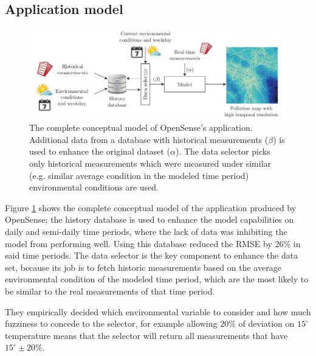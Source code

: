 \documentclass[11pt,a4paper,titlepage]{book}
\begin{document}
\subsection{Application model}
\begin{figure}[ht]
    \centering
    \includegraphics[width=\textwidth]{imgs/ch_2/OpenSense_data_flow.png}
    \caption{The complete conceptual model of OpenSense's application. Additional data from a database with historical measurements ($\beta$) is used to enhance the original dataset ($\alpha$). The data selector picks only historical measurements which were measured under similar (e.g. similar average condition in the modeled time period) environmental conditions are used. } 
    \label{opensense_flow}
\end{figure}
Figure \ref{opensense_flow} shows the complete conceptual model of the application produced by OpenSense; the history database is used to enhance the model capabilities on daily and semi-daily time periods, where the lack of data was inhibiting the model from performing well. Using this database reduced the RMSE by 26\% in said time periods.
\newline
\newline
The data selector is the key component to enhance the data set, because its job is to fetch historic measurements based on the average environmental condition of the modeled time period, which are the most likely to be similar to the real measurements of that time period.

They empirically decided which environmental variable to consider and how much fuzziness to concede to the selector, for example allowing $20\%$ of deviation on $15^{\circ}$ temperature means that the selector will return all measurements that have $15^{\circ} \pm 20\%$.
\end{document}
